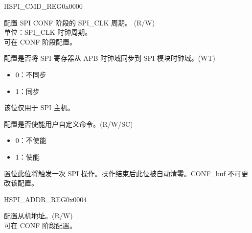 \begin{register}{H}{SPI\_CMD\_REG}{0x0000}\label{regdesc:SPICMDREG}
%
%
%
%
%
\regnewline%
\begin{regdesc}\begin{reglist}
\label{fielddesc:SPICONFBITLEN}\item [SPI\_CONF\_BITLEN] 配置 SPI CONF 阶段的 SPI\_CLK 周期。 (R/W)\\
单位：SPI\_CLK 时钟周期。\\
可在 CONF 阶段配置。
\label{fielddesc:SPIUPDATE}\item [SPI\_UPDATE] 配置是否将 SPI 寄存器从 APB 时钟域同步到 SPI 模块时钟域。(WT)\\
\begin{itemize}
    \item 0：不同步
    \item 1：同步
\end{itemize}
该位仅用于 SPI 主机。 
\label{fielddesc:SPIUSR}\item [SPI\_USR] 配置是否使能用户自定义命令。(R/W/SC)\\
\begin{itemize}
    \item 0：不使能
    \item 1：使能
\end{itemize}
置位此位将触发一次 SPI 操作。操作结束后此位被自动清零。CONF\_buf 不可更改该配置。 
\end{reglist}\end{regdesc}
\end{register}


\begin{register}{H}{SPI\_ADDR\_REG}{0x0004}\label{regdesc:SPIADDRREG}
%
\regnewline%
\begin{regdesc}\begin{reglist}
\label{fielddesc:SPIUSRADDRVALUE}\item [SPI\_USR\_ADDR\_VALUE] 配置从机地址。(R/W)\\
可在 CONF 阶段配置。 
\end{reglist}\end{regdesc}
\end{register}


